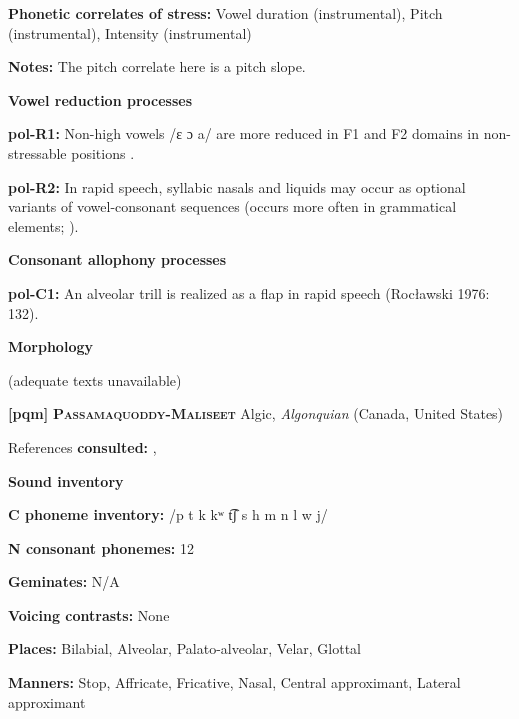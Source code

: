 \textbf{Phonetic correlates of stress:} Vowel duration (instrumental), Pitch (instrumental), Intensity (instrumental)



\textbf{Notes:} The pitch correlate here is a pitch slope.



\textbf{Vowel reduction processes}



\textbf{pol-R1:} Non-high vowels /ɛ ɔ a/ are more reduced in F1 and F2 domains in non-stressable positions \citep[378-9]{Nowak2006}.



\textbf{pol-R2:} In rapid speech, syllabic nasals and liquids may occur as optional variants of vowel-consonant sequences (occurs more often in grammatical elements; \citealt{Rubach1974}).



\textbf{Consonant allophony processes}



\textbf{pol-C1:} An alveolar trill is realized as a flap in rapid speech (Rocławski 1976: 132).



\textbf{Morphology}



(adequate texts unavailable)



\textbf{[pqm]}   \textbf{\textsc{Passamaquoddy-Maliseet}}  Algic, \textit{Algonquian} (Canada, United States)



References \textbf{consulted:} \citet{Leavitt1996}, \citet{LeSourd1993}



\textbf{Sound inventory}



\textbf{C phoneme inventory:} /p t k kʷ t͡ʃ s h m n l w j/



\textbf{N consonant phonemes:} 12



\textbf{Geminates:} N/A



\textbf{Voicing contrasts:} None



\textbf{Places:} Bilabial, Alveolar, Palato-alveolar, Velar, Glottal



\textbf{Manners:} Stop, Affricate, Fricative, Nasal, Central approximant, Lateral approximant



